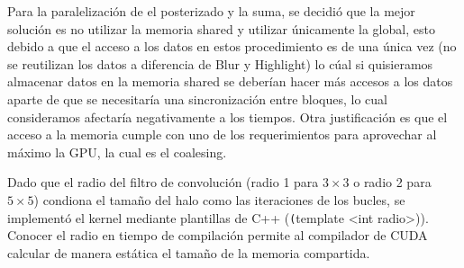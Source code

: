Para la paralelización de el posterizado y la suma, se decidió que la mejor solución es no utilizar la memoria shared y utilizar únicamente la global, esto debido a que el acceso a los datos en estos procedimiento es de una única vez (no se reutilizan los datos a diferencia de Blur y Highlight) lo cúal si quisieramos almacenar datos en la memoria shared se deberían hacer más accesos a los datos aparte de que se necesitaría una sincronización entre bloques, lo cual consideramos afectaría negativamente a los tiempos. Otra justificación es que el acceso a la memoria cumple con uno de los requerimientos para aprovechar al máximo la GPU, la cual es el coalesing. 

Dado que el radio del filtro de convolución (radio 1 para $3\times3$ o radio 2 para $5\times5$) condiona el tamaño del halo como las iteraciones de los bucles, se implementó el kernel mediante plantillas de C++ (\texttt(template <int radio>)). Conocer el radio en tiempo de compilación permite al compilador de CUDA calcular de manera estática el tamaño de la memoria compartida.